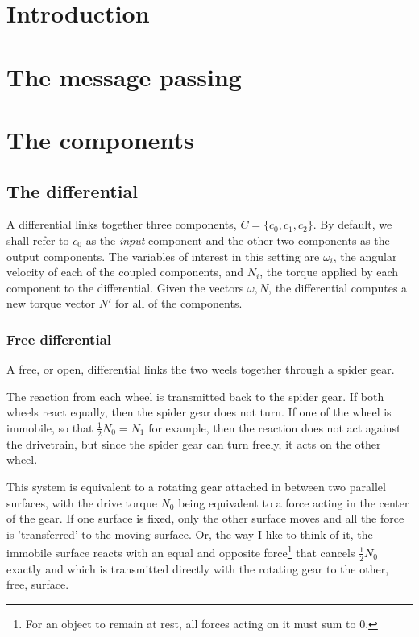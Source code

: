 \documentclass[a4paper]{report}
\begin{document}
\chapter{Introduction}

\chapter{The message passing}

\chapter{The components}

\section{The differential}

A differential links together three components, $C = \{c_0, c_1,
c_2\}$.  By default, we shall refer to $c_0$ as the {\em input}
component and the other two components as the output components.  The
variables of interest in this setting are $\omega_i$, the angular
velocity of each of the coupled components, and $N_i$, the torque
applied by each component to the differential. Given the vectors
$\omega, N$, the differential computes a new torque vector $N'$ for
all of the components.

\subsection{Free differential}

A free, or open, differential links the two weels together through a
spider gear.

The reaction from each wheel is transmitted back to the spider
gear. If both wheels react equally, then the spider gear does not
turn. If one of the wheel is immobile, so that $\frac{1}{2} N_0 = N_1$
for example, then the reaction does not act against the drivetrain,
but since the spider gear can turn freely, it acts on the other wheel.
 
This system is equivalent to a rotating gear attached in between two
parallel surfaces, with the drive torque $N_0$ being equivalent to a
force acting in the center of the gear. If one surface is fixed, only
the other surface moves and all the force is 'transferred' to the
moving surface. Or, the way I like to think of it, the immobile
surface reacts with an equal and opposite force\footnote{For an object
  to remain at rest, all forces acting on it must sum to 0.} that
cancels $\frac{1}{2}N_0$ exactly and which is transmitted directly
with the rotating gear to the other, free, surface.
\end{document}
